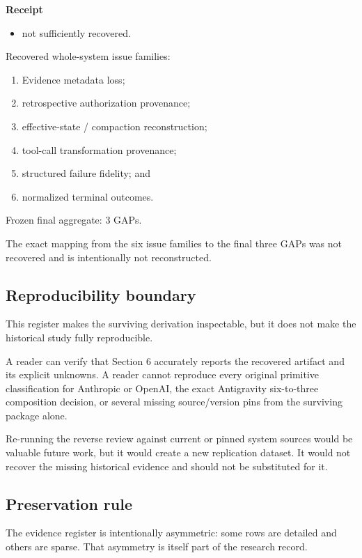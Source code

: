 \documentclass[11pt]{article}
\begin{document}
\textbf{Receipt}
\begin{itemize}
\item not sufficiently recovered.
\end{itemize}

Recovered whole-system issue families:

\begin{enumerate}
\item Evidence metadata loss;
\item retrospective authorization provenance;
\item effective-state / compaction reconstruction;
\item tool-call transformation provenance;
\item structured failure fidelity; and
\item normalized terminal outcomes.
\end{enumerate}

Frozen final aggregate: 3 GAPs.

The exact mapping from the six issue families to the final three GAPs was not recovered and is intentionally not reconstructed.

\subsection{Reproducibility boundary}

This register makes the surviving derivation inspectable, but it does not make the historical study fully reproducible.

A reader can verify that Section 6 accurately reports the recovered artifact and its explicit unknowns. A reader cannot reproduce every original primitive classification for Anthropic or OpenAI, the exact Antigravity six-to-three composition decision, or several missing source/version pins from the surviving package alone.

Re-running the reverse review against current or pinned system sources would be valuable future work, but it would create a new replication dataset. It would not recover the missing historical evidence and should not be substituted for it.

\subsection{Preservation rule}

The evidence register is intentionally asymmetric: some rows are detailed and others are sparse. That asymmetry is itself part of the research record.
\end{document}
